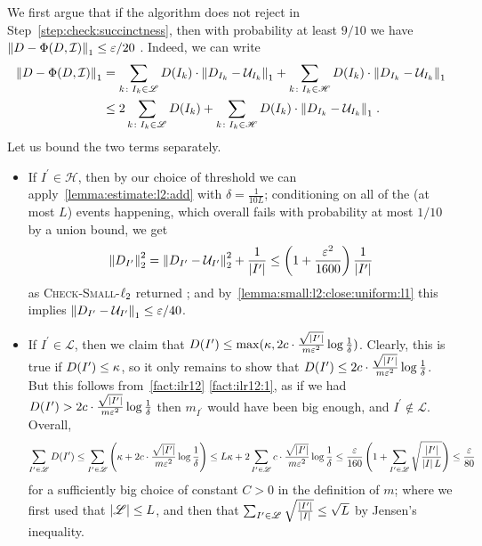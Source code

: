 We first argue that if the algorithm does not reject in Step~\ref{step:check:succinctness}, then with probability at least $9/10$ we have $\normone{\D-\Phi(\D,\mathcal{I})} \leq \eps/20$ . Indeed, we can write
\begin{align*}
  \normone{\D-\Phi(\D,\mathcal{I})} &= 
            \sum_{k\colon I_k \in \mathscr{L} } \D(I_k)\cdot \normone{\D_{I_k} - \uniform_{I_k}} 
          + \sum_{k\colon I_k \in \mathscr{H}} \D(I_k)\cdot \normone{\D_{I_k} - \uniform_{I_k}} \\
          &\leq 2\sum_{k\colon I_k \in \mathscr{L} } \D(I_k) + \sum_{k\colon I_k \in \mathscr{H} } \D(I_k)\cdot \normone{\D_{I_k} - \uniform_{I_k}}\;.
\end{align*}
Let us bound the two terms separately.
    \begin{itemize}
      \item If $I^\prime \in \mathscr{H}$, then by our choice of threshold we can apply~\cref{lemma:estimate:l2:add} with $\delta=\frac{1}{10L}$; conditioning on all of the (at most $L$) events happening, which overall fails with probability at most $1/10$ by a union bound, we get
        \[
            \normtwo{\D_{I^\prime}}^2 = \normtwo{\D_{I^\prime}-\uniform_{I^\prime}}^2 + \frac{1}{\abs{I^\prime}} 
            \leq \left( 1+\frac{\eps^2}{1600} \right) \frac{1}{\abs{I^\prime}}
        \]
        as \textsc{Check-Small-$\lp[2]$} returned \yes; and by~\cref{lemma:small:l2:close:uniform:l1} this implies $\normone{\D_{I^\prime} - \uniform_{I^\prime}}\leq \eps/40$.
      \item 
      If $I^\prime \in \mathscr{L}$, then we claim that 
      $\D(I^\prime) \leq \max( \kappa, 2c\cdot\frac{\sqrt{\abs{I^\prime}}}{m\eps^2}\log\frac{1}{\delta} )$. Clearly, this is true if $\D(I^\prime) \leq \kappa$, so it only remains to show that $\D(I^\prime) \leq 2c\cdot\frac{\sqrt{\abs{I^\prime}}}{m\eps^2}\log\frac{1}{\delta}$. But this follows from~\cref{fact:ilr12} \ref{fact:ilr12:1}, as if we had 
$\D(I^\prime) > 2c\cdot\frac{\sqrt{\abs{I^\prime}}}{m\eps^2}\log\frac{1}{\delta}$ then $m_{I^\prime}$ would have been big enough, and $I^\prime\notin \mathscr{L}$. Overall,
\[
\sum_{I^\prime \in \mathscr{L} } \D(I^\prime) 
\leq \sum_{I^\prime \in \mathscr{L} } \left( \kappa + 2c\cdot\frac{\sqrt{\abs{I^\prime}}}{m\eps^2}\log\frac{1}{\delta} \right)
\leq L\kappa + 2\sum_{I^\prime \in \mathscr{L} } c\cdot\frac{\sqrt{\abs{I^\prime}}}{m\eps^2}\log\frac{1}{\delta}
\leq \frac{\eps}{160}\left(1+ \sum_{I^\prime \in \mathscr{L} } \sqrt{\frac{\abs{I^\prime}}{\abs{I}L}}\right)
\leq \frac{\eps}{80}
\]
for a sufficiently big choice of constant $C>0$ in the definition of $m$; where we first used that $\abs{\mathscr{L}} \leq L$, and then that $\sum_{I^\prime \in \mathscr{L} } \sqrt{\frac{\abs{I^\prime}}{\abs{I}}}\leq \sqrt{L}$ by Jensen's inequality.

    \end{itemize}
